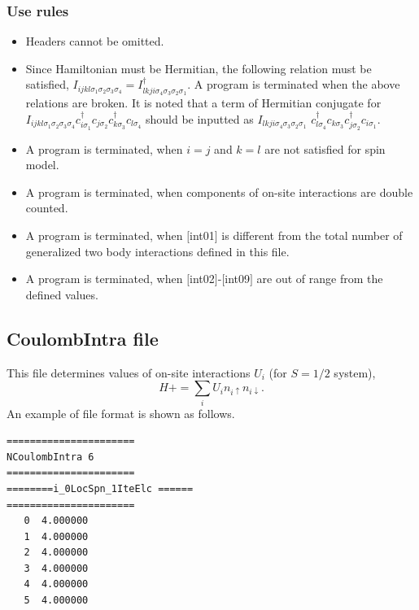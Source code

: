 \subsubsection{Use rules}
\begin{itemize}
\item Headers cannot be omitted. 
\item Since Hamiltonian must be Hermitian, the following relation must be satisfied, $I_{ijkl\sigma_1\sigma_2\sigma_3\sigma_4}=I_{lkji\sigma_4\sigma_3\sigma_2\sigma_1}^{\dag}$. A program is terminated when the above relations are broken.
It is noted that a term of Hermitian conjugate for $I_{ijkl\sigma_1\sigma_2\sigma_3\sigma_4}c_{i\sigma_1}^{\dagger}c_{j\sigma_2}c_{k\sigma_3}^{\dagger}c_{l\sigma_4}$ should be inputted as $I_{lkji\sigma_4\sigma_3\sigma_2\sigma_1}$ $c_{l\sigma_4}^{\dagger}c_{k\sigma_3}c_{j\sigma_2}^{\dagger}c_{i\sigma_1}$.
\item {A program is terminated, when $i=j$ and $k=l$ are not satisfied for spin model.}
\item A program is terminated, when components of on-site interactions are double counted.
\item A program is terminated, when $[$int01$]$ is different from the total number of generalized two body interactions defined in this file.
\item A program is terminated, when $[$int02$]$-$[$int09$]$ are out of range from the defined values.
\end{itemize}


\newpage
\subsection{CoulombIntra file}
This file determines values of on-site interactions $U_i$ {(for $S=1/2$ system)},
\begin{equation}
H+=\sum_{i}U_i n_ {i \uparrow}n_{i \downarrow}.
\end{equation}
An example of file format is shown as follows.

\begin{minipage}{12.5cm}
\begin{screen}
\begin{verbatim}
====================== 
NCoulombIntra 6  
====================== 
========i_0LocSpn_1IteElc ====== 
====================== 
   0  4.000000
   1  4.000000
   2  4.000000
   3  4.000000
   4  4.000000
   5  4.000000
\end{verbatim}
\end{screen}
\end{minipage}

